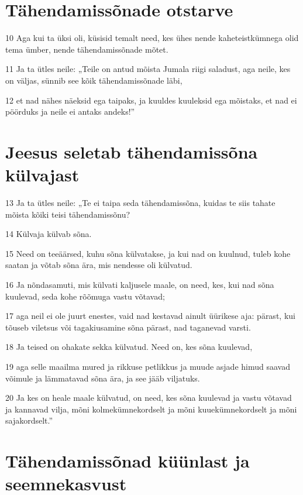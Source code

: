 \section*{Tähendamissõnade otstarve}

\par 10 Aga kui ta üksi oli, küsisid temalt need, kes ühes nende kaheteistkümnega olid tema ümber, nende tähendamissõnade mõtet.
\par 11 Ja ta ütles neile: „Teile on antud mõista Jumala riigi saladust, aga neile, kes on väljas, sünnib see kõik tähendamissõnade läbi,
\par 12 et nad nähes näeksid ega taipaks, ja kuuldes kuuleksid ega mõistaks, et nad ei pöörduks ja neile ei antaks andeks!”

\section*{Jeesus seletab tähendamissõna külvajast}

\par 13 Ja ta ütles neile: „Te ei taipa seda tähendamissõna, kuidas te siis tahate mõista kõiki teisi tähendamissõnu?
\par 14 Külvaja külvab sõna.
\par 15 Need on teeäärsed, kuhu sõna külvatakse, ja kui nad on kuulnud, tuleb kohe saatan ja võtab sõna ära, mis nendesse oli külvatud.
\par 16 Ja nõndasamuti, mis külvati kaljusele maale, on need, kes, kui nad sõna kuulevad, seda kohe rõõmuga vastu võtavad;
\par 17 aga neil ei ole juurt enestes, vaid nad kestavad ainult üürikese aja: pärast, kui tõuseb viletsus või tagakiusamine sõna pärast, nad taganevad varsti.
\par 18 Ja teised on ohakate sekka külvatud. Need on, kes sõna kuulevad,
\par 19 aga selle maailma mured ja rikkuse petlikkus ja muude asjade himud saavad võimule ja lämmatavad sõna ära, ja see jääb viljatuks.
\par 20 Ja kes on heale maale külvatud, on need, kes sõna kuulevad ja vastu võtavad ja kannavad vilja, mõni kolmekümnekordselt ja mõni kuuekümnekordselt ja mõni sajakordselt.”

\section*{Tähendamissõnad küünlast ja seemnekasvust}

